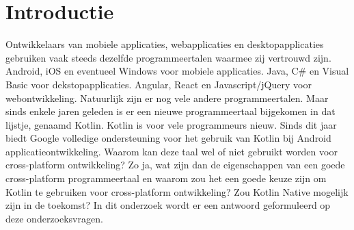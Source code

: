 
\section{Introductie} %
\label{sec:introductie}

Ontwikkelaars van mobiele applicaties, webapplicaties en desktopapplicaties gebruiken vaak steeds dezelfde programmeertalen waarmee zij vertrouwd zijn. Android, iOS en eventueel Windows voor mobiele applicaties. Java, C\# en Visual Basic voor dekstopapplicaties. Angular, React en Javascript/jQuery voor webontwikkeling. Natuurlijk zijn er nog vele andere programmeertalen. Maar sinds enkele jaren geleden is er een nieuwe programmeertaal bijgekomen in dat lijstje, genaamd Kotlin. 
\newline
\newline
Kotlin is voor vele programmeurs nieuw. Sinds dit jaar biedt Google volledige ondersteuning voor het gebruik van Kotlin bij Android applicatieontwikkeling. Waarom kan deze taal wel of niet gebruikt worden voor cross-platform ontwikkeling? Zo ja, wat zijn dan de eigenschappen van een goede cross-platform programmeertaal en waarom zou het een goede keuze zijn om Kotlin te gebruiken voor cross-platform ontwikkeling? Zou Kotlin Native mogelijk zijn in de toekomst? In dit onderzoek wordt er een antwoord geformuleerd op deze onderzoeksvragen.


